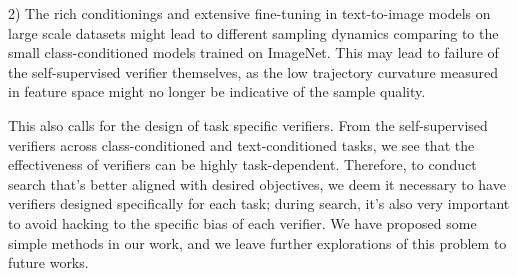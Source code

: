 \documentclass[11pt, letterpaper, logo]{googledeepmind}
\begin{document}
2) The rich conditionings and extensive fine-tuning in text-to-image models on large scale datasets might lead to different sampling dynamics comparing to the small class-conditioned models trained on ImageNet. This may lead to failure of the self-supervised verifier themselves, as the low trajectory curvature measured in feature space might no longer be indicative of the sample quality.

This also calls for the design of task specific verifiers. From the self-supervised verifiers across class-conditioned and text-conditioned tasks, we see that the effectiveness of verifiers can be highly task-dependent. Therefore, to conduct search that's better aligned with desired objectives, we deem it necessary to have verifiers designed specifically for each task; during search, it's also very important to avoid hacking to the specific bias of each verifier. We have proposed some simple methods in our work, and we leave further explorations of this problem to future works.

\begin{table}[t!]
    \centering
    \caption{\footnotesize{\textbf{\textit{Performance of self-supervised verifiers on DrawBench.}} All numbers are from FLUX.1-dev with random search. The first row is the reference performance without search.}}
    \label{tab:ssl-t2i}
    \vspace{-0.5cm}
\end{table}
\end{document}
